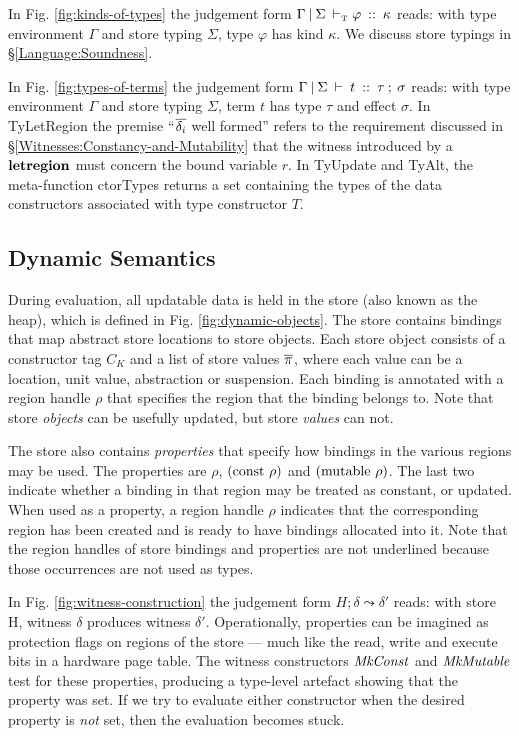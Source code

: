 In Fig. \ref{fig:kinds-of-types} the judgement form $\Gamma \: \arrowvert \: \Sigma \: \vdash_\textrm{\tiny{T}}\varphi \: :: \: \kappa$ reads: with type environment $\Gamma$ and store typing $\Sigma$, type $\varphi$ has kind $\kappa$. We discuss store typings in \S\ref{Language:Soundness}.

In Fig. \ref{fig:types-of-terms} the judgement form $\Gamma \: \arrowvert \: \Sigma \: \vdash \: t \: :: \: \tau \: ; \: \sigma$ reads: with type environment $\Gamma$ and store typing $\Sigma$, term $t$ has type $\tau$ and effect $\sigma$. In TyLetRegion the premise ``$\overline{\delta_i}$ well formed'' refers to the requirement discussed in \S\ref{Witnesses:Constancy-and-Mutability} that the witness introduced by a $\textrm{\textbf{letregion}}$ must concern the bound variable $r$. In TyUpdate and TyAlt, the meta-function ctorTypes returns a set containing the types of the data constructors associated with type constructor $T$.

\clearpage{}



\clearpage{}
\subsection{Dynamic Semantics}
\label{Language:DynamicSemantics}
During evaluation, all updatable data is held in the store (also known as the heap), which is defined in Fig. \ref{fig:dynamic-objects}. The store contains bindings that map abstract store locations to store objects. Each store object consists of a constructor tag $C_K$ and a list of store values $\overline{\pi}$, where each value can be a location, unit value, abstraction or suspension. Each binding is annotated with a region handle $\rho$ that specifies the region that the binding belongs to. Note that store \emph{objects} can be usefully updated, but store \emph{values} can not.

The store also contains \emph{properties} that specify how bindings in the various regions may be used. The properties are $\rho$, $(\textrm{const} \ \rho)$ and $(\textrm{mutable} \ \rho)$. The last two indicate whether a binding in that region may be treated as constant, or updated. When used as a property, a region handle $\rho$ indicates that the corresponding region has been created and is ready to have bindings allocated into it. Note that the region handles of store bindings and properties are not underlined because those occurrences are not used as types.

In Fig. \ref{fig:witness-construction} the judgement form $H; \delta \leadsto \delta'$ reads: with store H, witness $\delta$ produces witness $\delta'$. Operationally, properties can be imagined as protection flags on regions of the store --- much like the read, write and execute bits in a hardware page table.  The witness constructors $\operatorname{\mathit{MkConst}}$ and $\operatorname{\mathit{MkMutable}}$ test for these properties, producing a type-level artefact showing that the property was set. If we try to evaluate either constructor when the desired property is \emph{not} set, then the evaluation becomes stuck. 

